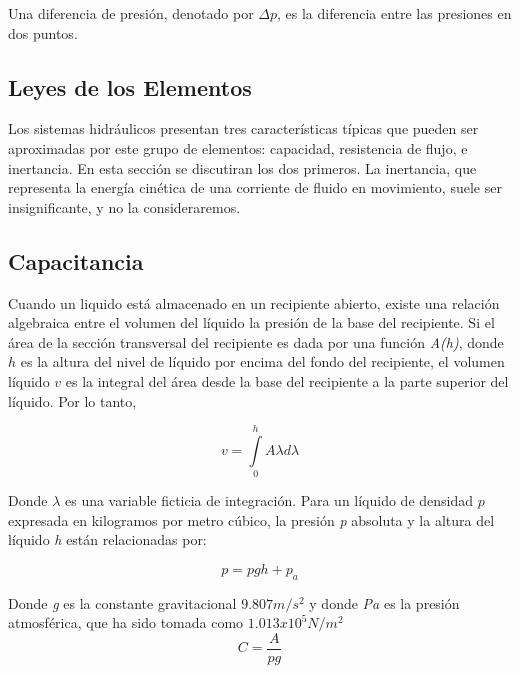 \documentclass[a4paper,12pt,twoside]{proyectotanquesecci}
\begin{document}
Una diferencia de presión, denotado por $\Delta p$, es la diferencia entre las presiones en dos puntos. \\

\subsection{Leyes de los Elementos}

Los sistemas hidráulicos presentan tres características típicas que pueden ser aproximadas por este grupo de elementos: capacidad, resistencia de flujo, e inertancia. En esta sección se discutiran los dos primeros. La inertancia, que representa la energía cinética de una corriente de fluido en movimiento, suele ser insignificante, y no la consideraremos.\\

\subsection{Capacitancia}

Cuando un liquido está almacenado en un recipiente abierto, existe una relación algebraica entre el volumen del líquido la presión de la base del recipiente. Si el área de la sección transversal del recipiente es dada por una función \textit{A(h)}, donde $h$ es la altura del nivel de líquido por encima del fondo del recipiente, el volumen líquido $v$ es la integral del área desde la base del recipiente a la parte superior del líquido. 
Por lo tanto,

\begin{equation}
v=\int \limits_{0}^{h} A{\lambda}d{\lambda}
\label{Ecu 2}
\end{equation}

Donde ${\lambda}$ es una variable ficticia de integración. Para un líquido de densidad $p$ expresada en kilogramos por metro cúbico, la presión \textit{p} absoluta y la altura del líquido \textit{h} están relacionadas por:

\begin{equation}
p=pgh+p_{a}
\label{Ecu 3}
\end{equation}

Donde \textit{g} es la constante gravitacional ${9.807 m/s^{2}}$ y donde \textit{Pa} es la presión atmosférica, que ha sido tomada como ${1.013 x 10^{5}  N/m^{2}}$\\

\begin{equation}
C=\frac{A}{pg}
\label{Ecu 4}
\end{equation}
\end{document}
